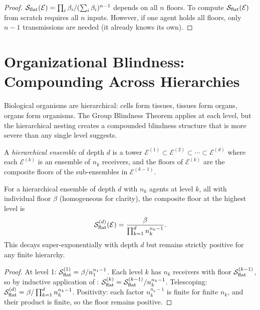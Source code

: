 \begin{proof}
$\mathcal{S}_{\mathrm{flat}}(\mathcal{E}) = \prod_i \beta_i / (\sum_i \beta_i)^{n-1}$ depends
on all $n$ floors.  To compute $\mathcal{S}_{\mathrm{flat}}(\mathcal{E})$ from scratch
requires all $n$ inputs.  However, if one agent holds all floors, only $n-1$
transmissions are needed (it already knows its own).
\end{proof}

\section{Organizational Blindness: Compounding Across Hierarchies}
\label{sec:organizational-blindness}

Biological organisms are hierarchical: cells form tissues, tissues form organs,
organs form organisms.  The Group Blindness Theorem applies at each level, but
the hierarchical nesting creates a compounded blindness structure that is more
severe than any single level suggests.

\begin{definition}
\label{def:hierarchical-ensemble}
A \emph{hierarchical ensemble} of depth $d$ is a tower
$\mathcal{E}^{(1)} \subset \mathcal{E}^{(2)} \subset \cdots \subset \mathcal{E}^{(d)}$
where each $\mathcal{E}^{(k)}$ is an ensemble of $n_k$ receivers,
and the floors of $\mathcal{E}^{(k)}$ are the composite floors of
the sub-ensembles in $\mathcal{E}^{(k-1)}$.
\end{definition}

\begin{theorem}
\label{thm:hierarchical-floor}
For a hierarchical ensemble of depth $d$ with $n_k$ agents at level $k$,
all with individual floor $\beta$ (homogeneous for clarity), the composite
floor at the highest level is
\[
  \mathcal{S}_{\mathrm{flat}}^{(d)}(\mathcal{E})
  = \frac{\beta}{\prod_{k=1}^{d} n_k^{n_k - 1}} .
\]
This decays super-exponentially with depth $d$ but remains strictly positive
for any finite hierarchy.
\end{theorem}

\begin{proof}
At level 1: $\mathcal{S}_{\mathrm{flat}}^{(1)} = \beta / n_1^{n_1-1}$.  Each level $k$ has
$n_k$ receivers with floor $\mathcal{S}_{\mathrm{flat}}^{(k-1)}$, so by inductive application
of :
$\mathcal{S}_{\mathrm{flat}}^{(k)} = \mathcal{S}_{\mathrm{flat}}^{(k-1)} / n_k^{n_k-1}$.
Telescoping: $\mathcal{S}_{\mathrm{flat}}^{(d)} = \beta / \prod_{k=1}^d n_k^{n_k-1}$.
Positivity: each factor $n_k^{n_k-1}$ is finite for finite $n_k$, and their
product is finite, so the floor remains positive.
\end{proof}

